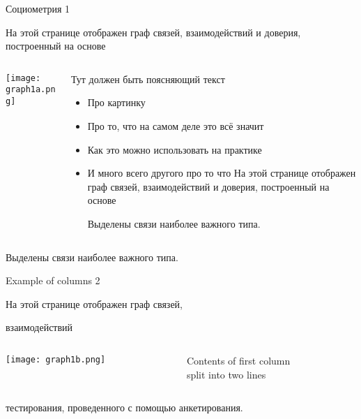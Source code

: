 \documentclass{beamer}
\begin{document}
\begin{frame}{Социометрия 1}

На этой странице отображен граф связей, взаимодействий и доверия, построенный на основе 

\begin{columns}[T] %
\begin{column}{6cm} %
\centering
          \texttt{[image: graph1a.png]}
\end{column}
\begin{column}{0.3\textwidth} %
     Тут должен быть поясняющий текст 

\tiny
\begin{itemize}
\item Про картинку
\item Про то, что на самом деле это всё значит
\item Как это можно использовать на практике
\item И много всего другого про то что На этой странице отображен граф связей, взаимодействий и доверия, построенный на основе

Выделены связи наиболее важного типа.
\end{itemize}
\end{column}
\end{columns}


Выделены связи наиболее важного типа.

\end{frame}




\begin{frame}{Example of columns 2}

На этой странице отображен граф связей, 

взаимодействий 
\begin{columns}[T] %
\begin{column}{6cm} %
\centering
          \texttt{[image: graph1b.png]}
\end{column}
\begin{column}{0.3\textwidth} %
     Contents of first column \\ split into two lines
\end{column}
\end{columns}


тестирования, проведенного с помощью анкетирования.

\end{frame}
\end{document}
